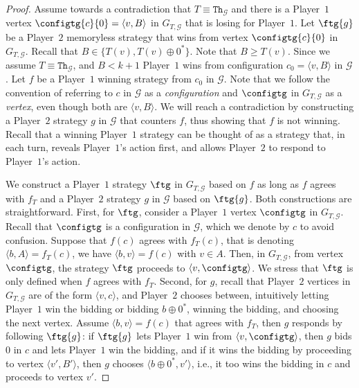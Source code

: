 \documentclass{theoretics}
\newcommand{\PO}{Player~$1$\xspace}
\newcommand{\PT}{Player~$2$\xspace}
\newcommand{\G}{{\mathcal G}}
\newcommand{\thresh}{\texttt{Th}\xspace}
\newcommand{\zug}[1]{\langle #1  \rangle}
\newcommand{\succb}[1]{#1 \oplus 0^*\xspace}
\begin{document}
\begin{proof}
Assume towards a contradiction that $T  \equiv \thresh_{\G}$ and there is a \PO vertex \(\configtg{c}{0} = \zug{v,B}\) in \(G_{T, \G}\) that is losing for \PO. 
Let \(\ftg{g}\) be a \PT memoryless strategy that wins from vertex $\configtg{c}{0}$ in \(G_{T, \G}\). 
Recall that \(B \in \{T(v), \succb{T(v)}\}\). 
Note that $B \geq T(v)$. Since we assume $T \equiv \thresh_\G$, and \(B < k+1\) \PO wins from configuration \(c_0 = \zug{v, B}\) in $\G$. Let \(f\) be a \PO winning strategy from \(c_0\) in \(\G\). Note that we follow the convention of referring to $c$ in $\G$ as a {\em configuration} and \(\configtg\) in $G_{T,\G}$ as a {\em vertex}, even though both are \(\zug{v, B}\). 
We will reach a contradiction by constructing a \PT strategy $g$ in $\G$ that counters $f$, thus showing that $f$ is not winning. 
Recall that a winning \PO strategy can be thought of as a strategy that, in each turn, reveals \PO's action first, and allows \PT to respond to \PO's action. 

We construct a \PO strategy $\ftg$ in $G_{T,\G}$ based on $f$ as long as $f$ agrees with $f_T$ and a \PT strategy $g$ in $\G$ based on $\ftg{g}$. Both constructions are straightforward. First, for $\ftg$, consider a \PO vertex $\configtg$ in $G_{T,\G}$. Recall that $\configtg$ is a configuration in $\G$, which we denote by $c$ to avoid confusion. Suppose that $f(c)$ agrees with $f_T(c)$, that is denoting $\zug{b, A} = f_T(c)$, we have $\zug{b, v} = f(c)$ with $v \in A$. 
Then, in $G_{T,\G}$, from vertex $\configtg$, the strategy $\ftg$ proceeds to $\zug{v, \configtg}$. We stress that $\ftg$ is only defined when $f$ agrees with $f_T$. 
Second, for $g$, recall that \PT vertices in $G_{T, \G}$ are of the form $\zug{v, c}$, and \PT chooses between, intuitively letting \PO win the bidding or bidding $\succb{b}$, winning the bidding, and choosing the next vertex. Assume $\zug{b, v} = f(c)$ that agrees with $f_T$, then $g$ responds by following $\ftg{g}$: if $\ftg{g}$ lets \PO win from $\zug{v, \configtg}$, then $g$ bids $0$ in $c$ and lets \PO win the bidding, and if it wins the bidding by proceeding to vertex $\zug{v', B'}$, then $g$ chooses $\zug{\succb{b}, v'}$, i.e., it too wins the bidding in $c$ and proceeds to vertex $v'$.


\end{proof}
\end{document}
